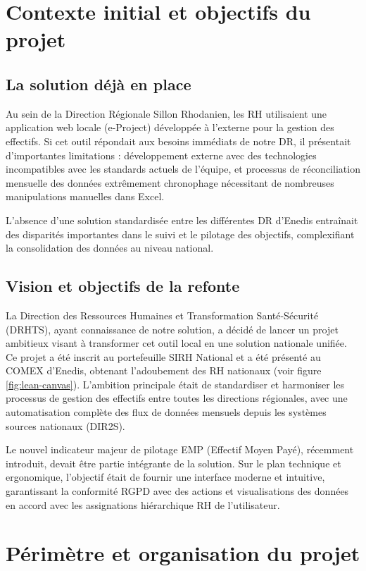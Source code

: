 \section{Contexte initial et objectifs du projet}

\subsection{La solution déjà en place}
Au sein de la Direction Régionale Sillon Rhodanien, les RH utilisaient une application web locale (e-Project) développée à l'externe pour la gestion des effectifs. Si cet outil répondait aux besoins immédiats de notre DR, il présentait d'importantes limitations : développement externe avec des technologies incompatibles avec les standards actuels de l'équipe, et processus de réconciliation mensuelle des données extrêmement chronophage nécessitant de nombreuses manipulations manuelles dans Excel.

L'absence d'une solution standardisée entre les différentes DR d'Enedis entraînait des disparités importantes dans le suivi et le pilotage des objectifs, complexifiant la consolidation des données au niveau national.

\subsection{Vision et objectifs de la refonte}
La Direction des Ressources Humaines et Transformation Santé-Sécurité (DRHTS), ayant connaissance de notre solution, a décidé de lancer un projet ambitieux visant à transformer cet outil local en une solution nationale unifiée. Ce projet a été inscrit au portefeuille SIRH National et a été présenté au COMEX d'Enedis, obtenant l'adoubement des RH nationaux (voir figure \ref{fig:lean-canvas}). L'ambition principale était de standardiser et harmoniser les processus de gestion des effectifs entre toutes les directions régionales, avec une automatisation complète des flux de données mensuels depuis les systèmes sources nationaux (DIR2S).

Le nouvel indicateur majeur de pilotage EMP (Effectif Moyen Payé), récemment introduit, devait être partie intégrante de la solution. Sur le plan technique et ergonomique, l'objectif était de fournir une interface moderne et intuitive, garantissant la conformité RGPD avec des actions et visualisations des données en accord avec les assignations hiérarchique RH de l'utilisateur.

\section{Périmètre et organisation du projet}

